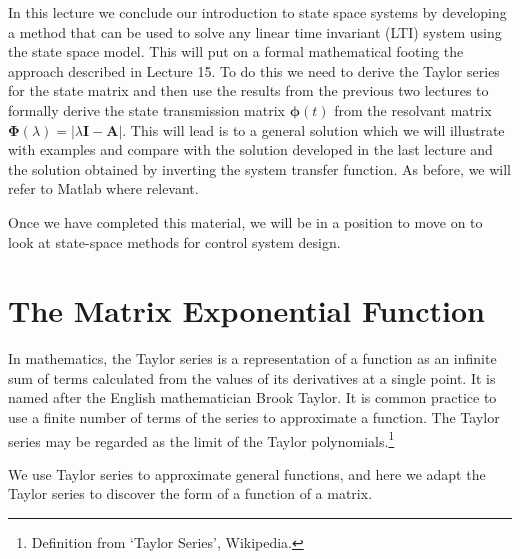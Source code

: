 \def\FileDate{10/02/01}
\def\FileVersion{1.0}

In this lecture we conclude our introduction to state space systems by developing a method that can be used to solve any linear time invariant (LTI) system using the state space model. This will put on a formal mathematical footing the approach described in Lecture 15. To do this we need to derive the Taylor series for the state matrix and then use the results from the previous two lectures to formally derive the state transmission matrix $\mathbf{\phi}(t)$ from the resolvant matrix $\mathbf{\Phi}(\lambda) = |\lambda\mathbf{I}-\mathbf{A}|$. This will lead is to a general solution which we will illustrate with examples and compare with the solution developed in the last lecture and the solution obtained by inverting the system transfer function. As before, we will refer to Matlab where relevant.

Once we have completed this material, we will be in a position to move on to look at state-space methods for control system design.

\section*{The Matrix Exponential Function}

In mathematics, the Taylor series is a representation of a function as an infinite sum of terms calculated from the values of its derivatives at a single point. It is named after the English mathematician Brook Taylor. It is common practice to use a finite number of terms of the series to approximate a function. The Taylor series may be regarded as the limit of the Taylor polynomials.\footnote{Definition from `Taylor Series', Wikipedia.}

We use Taylor series to approximate general functions, and here we adapt the Taylor series to discover the form of a function of a matrix.


\ifslidesonly
\begin{slide}
   
\end{slide}
\fi




\ifslidesonly
\begin{slide}
   
\end{slide}
\fi



